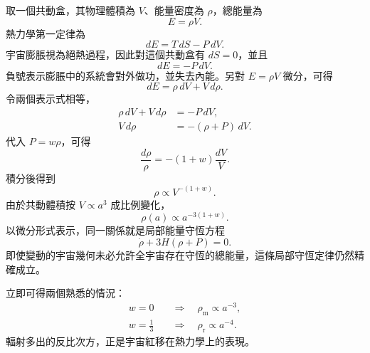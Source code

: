 取一個共動盒，其物理體積為 \(V\)、能量密度為 \(\rho\)，總能量為
\begin{equation}
E=\rho V.
\end{equation}
熱力學第一定律為
\begin{equation}
dE=T\,dS-P\,dV.
\end{equation}
宇宙膨脹視為絕熱過程，因此對這個共動盒有 \(dS=0\)，並且
\begin{equation}
dE=-P\,dV.
\label{eq:c04-adiabatic-first-law}
\end{equation}
負號表示膨脹中的系統會對外做功，並失去內能。另對 \(E=\rho V\) 微分，可得
\begin{equation}
dE=\rho\,dV+V\,d\rho.
\end{equation}
令兩個表示式相等，
\begin{align}
\rho\,dV+V\,d\rho&=-P\,dV,\\
V\,d\rho&=-(\rho+P)\,dV.
\label{eq:c04-volume-continuity}
\end{align}
代入 \(P=w\rho\)，可得
\begin{equation}
\frac{d\rho}{\rho}=-(1+w)\frac{dV}{V}.
\end{equation}
積分後得到
\begin{equation}
\rho\propto V^{-(1+w)}.
\end{equation}
由於共動體積按 \(V\propto a^3\) 成比例變化，
\begin{equation}
\boxed{\rho(a)\propto a^{-3(1+w)}}.
\label{eq:c04-density-scaling}
\end{equation}
以微分形式表示，同一關係就是局部能量守恆方程
\begin{equation}
\dot\rho+3H(\rho+P)=0.
\label{eq:c04-continuity}
\end{equation}
即使變動的宇宙幾何未必允許全宇宙存在守恆的總能量，這條局部守恆定律仍然精確成立。

立即可得兩個熟悉的情況：
\begin{align}
w=0
&\quad\Longrightarrow\quad
\rho_{\mathrm m}\propto a^{-3},\\
w=\frac13
&\quad\Longrightarrow\quad
\rho_{\mathrm r}\propto a^{-4}.
\end{align}
輻射多出的反比次方，正是宇宙紅移在熱力學上的表現。

\begin{classroomqa}
\end{classroomqa}

